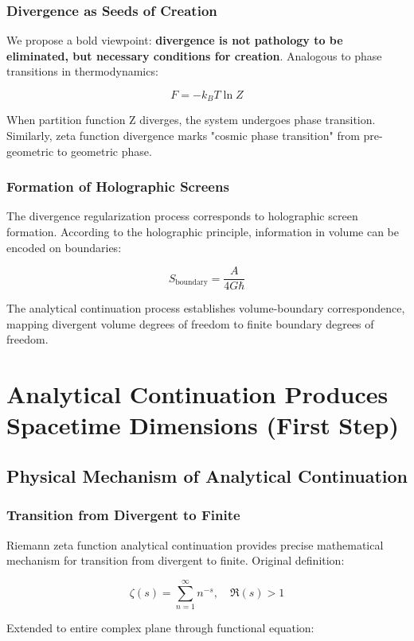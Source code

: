 \documentclass[12pt,a4paper]{article}
\begin{document}
\subsubsection{Divergence as Seeds of Creation}

We propose a bold viewpoint: \textbf{divergence is not pathology to be eliminated, but necessary conditions for creation}. Analogous to phase transitions in thermodynamics:

$$F = -k_B T \ln Z$$

When partition function Z diverges, the system undergoes phase transition. Similarly, zeta function divergence marks "cosmic phase transition" from pre-geometric to geometric phase.

\subsubsection{Formation of Holographic Screens}

The divergence regularization process corresponds to holographic screen formation. According to the holographic principle, information in volume can be encoded on boundaries:

$$S_{\text{boundary}} = \frac{A}{4G\hbar}$$

The analytical continuation process establishes volume-boundary correspondence, mapping divergent volume degrees of freedom to finite boundary degrees of freedom.

\section{Analytical Continuation Produces Spacetime Dimensions (First Step)}

\subsection{Physical Mechanism of Analytical Continuation}

\subsubsection{Transition from Divergent to Finite}

Riemann zeta function analytical continuation provides precise mathematical mechanism for transition from divergent to finite. Original definition:

$$\zeta(s) = \sum_{n=1}^{\infty} n^{-s}, \quad \Re(s) > 1$$

Extended to entire complex plane through functional equation:
\end{document}
